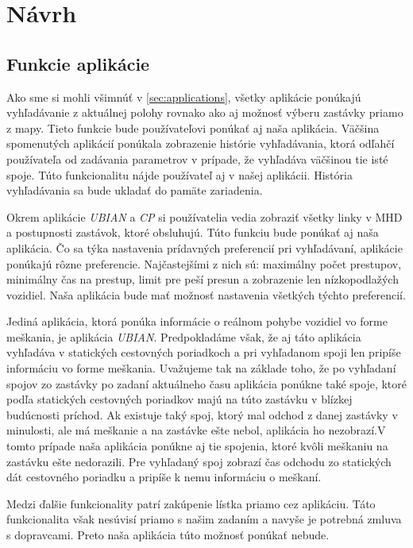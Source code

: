 \chapter{Návrh}
\label{kap:nav}

\section{Funkcie aplikácie}
Ako sme si mohli všimnúť v \ref{sec:applications}, všetky aplikácie ponúkajú vyhľadávanie z aktuálnej polohy rovnako ako aj možnosť výberu zastávky priamo z mapy. Tieto funkcie bude používateľovi ponúkať aj naša aplikácia. Väčšina spomenutých aplikácií ponúkala zobrazenie histórie vyhľadávania, ktorá odľahčí používateľa od zadávania parametrov v prípade, že vyhľadáva väčšinou tie isté spoje. Túto funkcionalitu nájde používateľ aj v našej aplikácii. História vyhľadávania sa bude ukladať do pamäte zariadenia. 

Okrem aplikácie \textit{UBIAN} a \textit{CP} si používatelia vedia zobraziť všetky linky v MHD a postupnosti zastávok, ktoré obsluhujú. Túto funkciu bude ponúkať aj naša aplikácia. Čo sa týka nastavenia prídavných preferencií pri vyhľadávaní, aplikácie ponúkajú rôzne preferencie. Najčastejšími z nich sú: maximálny počet prestupov, minimálny čas na prestup, limit pre peší presun a  zobrazenie len nízkopodlažých vozidiel. Naša aplikácia bude mať možnosť nastavenia všetkých týchto preferencií.

Jediná aplikácia, ktorá ponúka informácie o reálnom pohybe vozidiel vo forme meškania, je aplikácia \textit{UBIAN}. Predpokladáme však, že aj táto aplikácia vyhľadáva v statických cestovných poriadkoch a pri vyhľadanom spoji len pripíše informáciu vo forme meškania. Uvažujeme tak na základe toho, že po vyhľadaní spojov zo zastávky po zadaní aktuálneho času aplikácia ponúkne také spoje, ktoré podľa statických cestovných poriadkov majú na túto zastávku v blízkej budúcnosti príchod. Ak existuje taký spoj, ktorý mal odchod z danej zastávky v minulosti, ale má meškanie a na zastávke ešte nebol, aplikácia ho nezobrazí.V tomto prípade naša aplikácia ponúkne aj tie spojenia, ktoré kvôli meškaniu na zastávku ešte nedorazili. Pre vyhľadaný spoj zobrazí  čas odchodu zo statických dát cestovného poriadku a pripíše k nemu informáciu o  meškaní.

Medzi ďalšie funkcionality patrí zakúpenie lístka priamo cez aplikáciu. Táto funkcionalita však nesúvisí priamo s našim zadaním a navyše je potrebná zmluva s dopravcami. Preto naša aplikácia túto možnosť ponúkať nebude.


